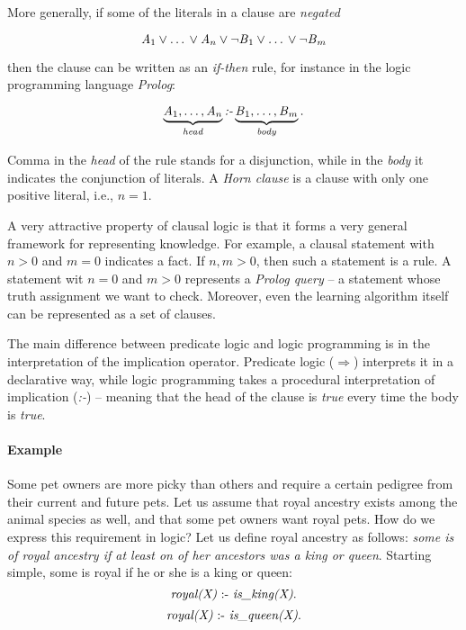 More generally, if some of the literals in a clause are \textit{negated}

$$ \text{\textit{A}}_1 \vee \text{\ldots} \vee \text{\textit{A}}_n \vee \neg \text{\textit{B}}_1 \vee \text{\textit{\ldots}} \vee \neg \text{\textit{B}}_m$$

then the clause can be written as an \textit{if-then} rule, for instance in the logic programming language \textit{Prolog}:

$$ \underbrace{\text{\textit{A}}_1, \text{\ldots}, \text{\textit{A}}_n}_{\text{\textit{head}}} \text{\textit{:-}} \underbrace{\text{\textit{B}}_1, \text{\textit{\ldots}}, \text{\textit{B}}_m}_{\text{\textit{body}}}.$$

Comma in the \textit{head} of the rule stands for a disjunction, while in the \textit{body} it indicates the conjunction of literals.
A \textit{Horn clause} is a clause with only one positive literal, i.e., $n = 1$.



A very attractive property of clausal logic is that it forms a very general framework for representing knowledge.
For example, a clausal statement with $n > 0$ and $m = 0$ indicates a fact.
If $n, m > 0$, then such a statement is a rule.
A statement wit $n=0$ and $m > 0$ represents a \textit{Prolog query} -- a statement whose truth assignment we want to check.
Moreover, even the learning algorithm itself can be represented as a set of clauses.



The main difference between predicate logic and logic programming is in the interpretation of the implication operator.
Predicate logic ($\Rightarrow$) interprets it in a declarative way, while logic programming takes a procedural interpretation of implication (\textit{:-}) -- meaning that the head of the clause is \textit{true} every time the body is \textit{true}.



\paragraph{Example}
Some pet owners are more picky than others and require a certain pedigree from their current and future pets.
Let us assume that royal ancestry exists among the animal species as well, and that some pet owners want royal pets.
How do we express this requirement in logic?
Let us define royal ancestry as follows: \textit{some is of royal ancestry if at least on of her ancestors was a king or queen}.
Starting simple, some is royal if he or she is a king or queen:
$$ \text{\textit{royal(X)}} \text{ :- } \text{\textit{is\_king(X)}}.$$
$$ \text{\textit{royal(X)}} \text{ :- } \text{\textit{is\_queen(X)}}.$$

